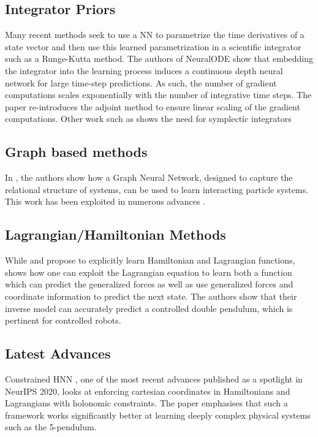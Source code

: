 \documentclass[twoside]{article}
\begin{document}
\subsection{Integrator Priors}
Many recent methods seek to use a NN to parametrize the time derivatives of a state vector and then use this learned parametrization in a scientific integrator such as a Runge-Kutta method. The authors of NeuralODE \cite{chen_neural_2018} show that embedding the integrator into the learning process induces a continuous depth neural network for large time-step predictions. As such, the number of gradient computations scales exponentially with the number of integrative time steps. The paper re-introduces the adjoint method to ensure linear scaling of the gradient computations. Other work such as \cite{zhu_deep_2020} shows the need for symplectic integrators 

\subsection{Graph based methods}
In \cite{battaglia_interaction_2016}, the authors show how a Graph Neural Network, designed to capture the relational structure of systems, can be used to learn interacting particle systems. This work has been exploited in numerous advances \cite{sanchez-gonzalez_graph_2018,sanchez-gonzalez_learning_2020,cranmer_lagrangian_2020}.

\subsection{Lagrangian/Hamiltonian Methods}
While \cite{cranmer_lagrangian_2020} and \cite{greydanus_hamiltonian_2019} propose to explicitly learn Hamiltonian and Lagrangian functions, \cite{lutter_deep_2019} shows how one can exploit the Lagrangian equation to learn both a function which can predict the generalized forces as well as use generalized forces and coordinate information to predict the next state. The authors show that their inverse model can accurately predict a controlled double pendulum, which is pertinent for controlled robots.


\subsection{Latest Advances}
Constrained HNN \cite{finzi_generalizing_2020}, one of the most recent advances published as a spotlight in NeurIPS 2020, looks at enforcing cartesian coordinates in Hamiltonians and Lagrangians with holonomic constraints. The paper emphasises that such a framework works significantly better at learning deeply complex physical systems such as the 5-pendulum. 
\end{document}
